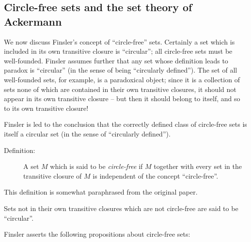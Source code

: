\subsection{Circle-free sets and the set theory of Ackermann}

We now discuss Finsler's concept of ``circle-free'' sets.  Certainly a
set which is included in its own transitive closure is ``circular'';
all circle-free sets must be well-founded.  Finsler assumes further
that any set whose definition leads to paradox is ``circular'' (in the
sense of being ``circularly defined'').  The set of all well-founded
sets, for example, is a paradoxical object; since it is a collection
of sets none of which are contained in their own transitive closures,
it should not appear in its own transitive closure -- but then it
should belong to itself, and so to its own transitive closure!

Finsler is led to the conclusion that the correctly defined class of
circle-free sets is itself a circular set (in the sense of
``circularly defined'').

\begin{description}

\item[Definition:] A set $M$ which is said to be {\em circle-free\/}
if $M$ together with every set in the transitive closure of $M$ is
independent of the concept ``circle-free''.

\end{description}

This definition is somewhat paraphrased from the original paper.

Sets not in their own transitive closures which are not circle-free
are said to be ``circular''.

Finsler asserts the following propositions about circle-free sets:

